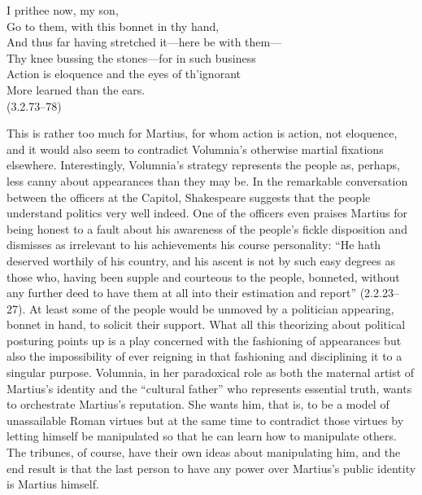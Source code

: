 \begin{vq}
I prithee now, my son,\\
Go to them, with this bonnet in thy hand,\\
And thus far having stretched it---here be with them---\\
Thy knee bussing the stones---for in such business\\
Action is eloquence and the eyes of th'ignorant\\
More learned than the ears.\\
\hfill(3.2.73--78)
\end{vq}
This is rather too much for Martius, for whom action is action, not eloquence, and it would also seem to contradict Volumnia's otherwise martial fixations elsewhere.
Interestingly, Volumnia's strategy represents the people as, perhaps, less canny about appearances than they may be.
In the remarkable conversation between the officers at the Capitol, Shakespeare suggests that the people understand politics very well indeed.
One of the officers even praises Martius for being honest to a fault about his awareness of the people's fickle disposition and dismisses as irrelevant to his achievements his course personality: ``He hath deserved worthily of his country, and his ascent is not by such easy degrees as those who, having been supple and courteous to the people, bonneted, without any further deed to have them at all into their estimation and report'' (2.2.23--27).
At least some of the people would be unmoved by a politician appearing, bonnet in hand, to solicit their support.
What all this theorizing about political posturing points up is a play concerned with the fashioning of appearances but also the impossibility of ever reigning in that fashioning and disciplining it to a singular purpose.
Volumnia, in her paradoxical role as both the maternal artist of Martius's identity and the ``cultural father'' who represents essential truth, wants to orchestrate Martius's reputation.
She wants him, that is, to be a model of unassailable Roman virtues but at the same time to contradict those virtues by letting himself be manipulated so that he can learn how to manipulate others.
The tribunes, of course, have their own ideas about manipulating him, and the end result is that the last person to have any power over Martius's public identity is Martius himself.

